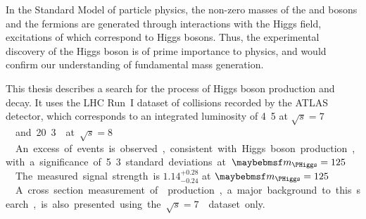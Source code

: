 
In the Standard Model of particle physics, the non-zero masses of the \PW and \PZ bosons and 
the fermions are generated through interactions with the Higgs field, excitations of which 
correspond to Higgs bosons. Thus, the experimental discovery of the Higgs boson is of prime 
importance to physics, and would confirm our understanding of fundamental mass generation.

This thesis describes a search for the \ggHWWlvlv process of Higgs boson production and decay.
It uses the LHC Run~I dataset of \pp collisions recorded by the ATLAS detector, which 
corresponds to an integrated luminosity of \unit{4.5}{\invfb} at \unit{$\sqrt{s} = 7$}{\TeV} 
and \unit{20.3}{\invfb} at \unit{$\sqrt{s} = 8$}{\TeV}. An excess of events is observed, 
consistent with Higgs boson production, with a significance of 5.3 standard deviations at 
\unit{$\mH = 125$}{\GeV}. The measured signal strength is $1.14^{+0.28}_{-0.24}$ at 
\unit{$\mH = 125$}{\GeV}. A cross section measurement of \WW production, a major background 
to this search, is also presented using the \unit{$\sqrt{s} = 7$}{\TeV} dataset only.
